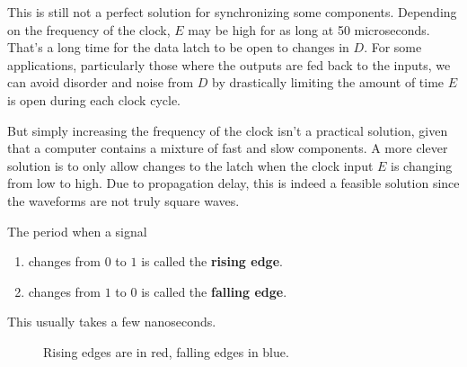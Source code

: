   This is still not a perfect solution for synchronizing some components. Depending on the frequency of the clock, $E$ may be high for as long at 50 microseconds. That's a long time for the data latch to be open to changes in $D$. For some applications, particularly those where the outputs are fed back to the inputs, we can avoid disorder and noise from $D$ by drastically limiting the amount of time $E$ is open during each clock cycle. 
  
  But simply increasing the frequency of the clock isn't a practical solution, given that a computer contains a mixture of fast and slow components. A more clever solution is to only allow changes to the latch when the clock input $E$ is changing from low to high. Due to propagation delay, this is indeed a feasible solution since the waveforms are not truly square waves. 

  \begin{definition}
    The period when a signal 
    \begin{enumerate}
      \item changes from $0$ to $1$ is called the \textbf{rising edge}. 
      \item changes from $1$ to $0$ is called the \textbf{falling edge}. 
    \end{enumerate}
    This usually takes a few nanoseconds. 

    \begin{figure}[H]
      \centering 
      \caption{Rising edges are in red, falling edges in blue.}
    \end{figure}
  \end{definition}

